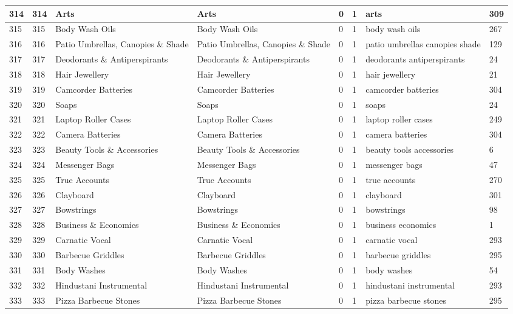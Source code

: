 \begin{longtable}{|l|l|l|l|l|l|l|l|}
314 & 314 & Arts & Arts & 0 & 1 & arts & 309 \\ \hline 
315 & 315 & Body Wash Oils & Body Wash Oils & 0 & 1 & body wash oils & 267 \\ \hline 
316 & 316 & Patio Umbrellas, Canopies \& Shade & Patio Umbrellas, Canopies \& Shade & 0 & 1 & patio umbrellas canopies shade & 129 \\ \hline 
317 & 317 & Deodorants \& Antiperspirants & Deodorants \& Antiperspirants & 0 & 1 & deodorants antiperspirants & 24 \\ \hline 
318 & 318 & Hair Jewellery & Hair Jewellery & 0 & 1 & hair jewellery & 21 \\ \hline 
319 & 319 & Camcorder Batteries & Camcorder Batteries & 0 & 1 & camcorder batteries & 304 \\ \hline 
320 & 320 & Soaps & Soaps & 0 & 1 & soaps & 24 \\ \hline 
321 & 321 & Laptop Roller Cases & Laptop Roller Cases & 0 & 1 & laptop roller cases & 249 \\ \hline 
322 & 322 & Camera Batteries & Camera Batteries & 0 & 1 & camera batteries & 304 \\ \hline 
323 & 323 & Beauty Tools \& Accessories & Beauty Tools \& Accessories & 0 & 1 & beauty tools accessories & 6 \\ \hline 
324 & 324 & Messenger Bags & Messenger Bags & 0 & 1 & messenger bags & 47 \\ \hline 
325 & 325 & True Accounts & True Accounts & 0 & 1 & true accounts & 270 \\ \hline 
326 & 326 & Clayboard & Clayboard & 0 & 1 & clayboard & 301 \\ \hline 
327 & 327 & Bowstrings & Bowstrings & 0 & 1 & bowstrings & 98 \\ \hline 
328 & 328 & Business \& Economics & Business \& Economics & 0 & 1 & business economics & 1 \\ \hline 
329 & 329 & Carnatic Vocal & Carnatic Vocal & 0 & 1 & carnatic vocal & 293 \\ \hline 
330 & 330 & Barbecue Griddles & Barbecue Griddles & 0 & 1 & barbecue griddles & 295 \\ \hline 
331 & 331 & Body Washes & Body Washes & 0 & 1 & body washes & 54 \\ \hline 
332 & 332 & Hindustani Instrumental & Hindustani Instrumental & 0 & 1 & hindustani instrumental & 293 \\ \hline 
333 & 333 & Pizza Barbecue Stones & Pizza Barbecue Stones & 0 & 1 & pizza barbecue stones & 295 \\ \hline 

\end{longtable}
